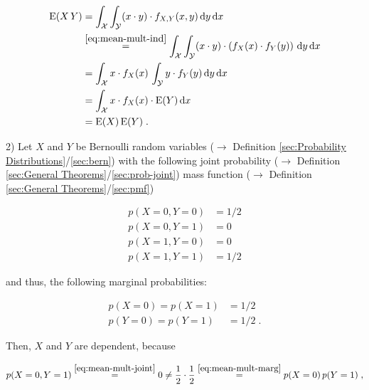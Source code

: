 \documentclass[a4paper,12pt,twoside]{book}
\begin{document}
\begin{equation} \label{eq:mean-mult-mean-mult-cont}
\begin{split}
\mathrm{E}(X\,Y) &= \int_{\mathcal{X}} \int_{\mathcal{Y}} (x \cdot y) \cdot f_{X,Y}(x,y) \, \mathrm{d}y \, \mathrm{d}x \\
&\overset{\eqref{eq:mean-mult-ind}}{=} \int_{\mathcal{X}} \int_{\mathcal{Y}} (x \cdot y) \cdot \left( f_X(x) \cdot f_Y(y) \right) \, \mathrm{d}y \, \mathrm{d}x \\
&= \int_{\mathcal{X}} x \cdot f_X(x) \, \int_{\mathcal{Y}} y \cdot f_Y(y)  \, \mathrm{d}y \, \mathrm{d}x \\
&= \int_{\mathcal{X}} x \cdot f_X(x) \cdot \mathrm{E}(Y) \, \mathrm{d}x \\
&= \mathrm{E}(X) \, \mathrm{E}(Y) \; . \\
\end{split}
\end{equation}

\vspace{1em}
2) Let $X$ and $Y$ be Bernoulli random variables ($\rightarrow$ Definition \ref{sec:Probability Distributions}/\ref{sec:bern}) with the following joint probability ($\rightarrow$ Definition \ref{sec:General Theorems}/\ref{sec:prob-joint}) mass function ($\rightarrow$ Definition \ref{sec:General Theorems}/\ref{sec:pmf})

\begin{equation} \label{eq:mean-mult-joint}
\begin{split}
p(X=0, Y=0) &= 1/2 \\
p(X=0, Y=1) &= 0 \\
p(X=1, Y=0) &= 0 \\
p(X=1, Y=1) &= 1/2
\end{split}
\end{equation}

and thus, the following marginal probabilities:

\begin{equation} \label{eq:mean-mult-marg}
\begin{split}
p(X=0) = p(X=1) &= 1/2 \\
p(Y=0) = p(Y=1) &= 1/2 \; .
\end{split}
\end{equation}

Then, $X$ and $Y$ are dependent, because

\begin{equation} \label{eq:mean-mult-dep}
p(X=0, Y=1) \overset{\eqref{eq:mean-mult-joint}}{=} 0 \neq \frac{1}{2} \cdot \frac{1}{2} \overset{\eqref{eq:mean-mult-marg}}{=} p(X=0) \, p(Y=1) \; ,
\end{equation}
\end{document}
